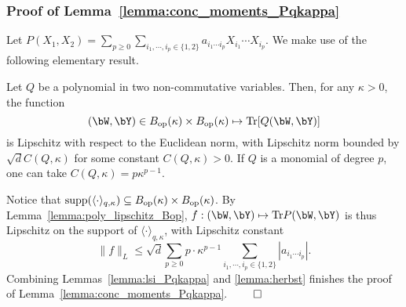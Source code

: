 \subsubsection{Proof of Lemma~\ref{lemma:conc_moments_Pqkappa}}\label{subsubsec:proof_conc_moments_Pqkappa}

Let $P(X_1, X_2) = \sum_{p\geq 0}\sum_{i_1, \cdots, i_p \in \{1,2\}} a_{i_1 \cdots i_p} X_{i_1} \cdots X_{i_p}$.
We make use of the following elementary result.
\begin{lemma}\label{lemma:poly_lipschitz_Bop}
    Let $Q$ be a polynomial in two non-commutative variables.  
    Then, for any $\kappa > 0$, the function 
    \begin{equation*}
        (\bW , \bY) \in B_\op(\kappa) \times B_\op(\kappa) \mapsto \Tr[Q(\bW, \bY)]
    \end{equation*}
    is Lipschitz with respect to the Euclidean norm, with Lipschitz norm bounded by $\sqrt{d} C(Q, \kappa)$ for some constant $C(Q, \kappa) > 0$. 
    If $Q$ is a monomial of degree $p$, one can take $C(Q, \kappa) = p \kappa^{p-1}$.
\end{lemma}
\noindent
Notice that $\operatorname*{supp}(\langle \cdot \rangle_{q,\kappa}) \subseteq B_{\mathrm{op}}(\kappa) \times B_{\mathrm{op}}(\kappa)$.
By Lemma~\ref{lemma:poly_lipschitz_Bop}, $f:(\bW, \bY) \mapsto \Tr P(\bW, \bY)$ is thus Lipschitz on the support of $\langle \cdot \rangle_{q,\kappa}$, 
with Lipschitz constant
\begin{equation*}
    \|f\|_L \leq \sqrt{d} \sum_{p \geq 0} p \cdot \kappa^{p-1} \sum_{i_1, \cdots, i_p \in \{1,2\}} |a_{i_1 \cdots i_p}|.
\end{equation*}
Combining Lemmas~\ref{lemma:lsi_Pqkappa} and \ref{lemma:herbst} finishes the proof of Lemma~\ref{lemma:conc_moments_Pqkappa}.
$\qed$
